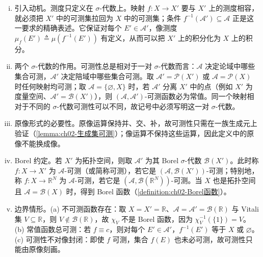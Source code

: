 \documentclass[../../main.tex]{subfiles}%
\begin{document}
\begin{remark}\label{remark:ch02-Borel可测}
\begin{enumerate}[(i)]
\item 引入动机。测度只定义在 $\sigma$-代数上。映射 $f:X\to X'$ 要与 $X'$ 上的测度相容，就必须把 $X'$ 中的可测集拉回为 $X$ 中的可测集；条件 $f^{-1}(\mathscr A')\subseteq\mathscr A$ 正是这一要求的精确表述。它保证对每个 $E'\in\mathscr A'$，像测度 $\mu_f(E')\triangleq\mu(f^{-1}(E'))$ 有定义，从而可以把 $X'$ 上的积分化为 $X$ 上的积分。
\item 两个 $\sigma$-代数的作用。可测性总是相对于一对 $\sigma$-代数而言：$\mathscr A$ 决定论域中哪些集合可测，$\mathscr A'$ 决定陪域中哪些集合可测。取 $\mathscr A'=\mathscr P(X')$ 或 $\mathscr A=\mathscr P(X)$ 时任何映射均可测；取 $\mathscr A=\{\varnothing,X\}$ 时，若 $\mathscr A'$ 分离 $X'$ 中的点（例如 $X'$ 为度量空间、$\mathscr A'=\mathscr B(X')$），则 $(\mathscr A,\mathscr A')$-可测函数必为常值。同一个映射相对于不同的 $\sigma$-代数可测性可以不同，故记号中必须写明这一对 $\sigma$-代数。
\item 原像形式的必要性。原像运算保持并、交、补，故可测性只需在一族生成元上验证（\cref{lemma:ch02-生成集可测}）；像运算不保持这些运算，因此定义中的原像不能换成像。
\item Borel 约定。若 $X'$ 为拓扑空间，则取 $\mathscr A'$ 为其 Borel $\sigma$-代数 $\mathscr B(X')$。此时称 $f:X\to X'$ 为 $\mathscr A$-可测（或简称可测），若它是 $(\mathscr A,\mathscr B(X'))$-可测；特别地，称 $f:X\to\mathbb{R}^N$ 为 $\mathscr A$-可测，若它是 $(\mathscr A,\mathscr B(\mathbb{R}^N))$-可测。当 $X$ 也是拓扑空间且 $\mathscr A=\mathscr B(X)$ 时，得到 Borel 函数（\cref{definition:ch02-Borel函数}）。
\item 边界情形。(a) 不可测函数存在：取 $X=X'=\mathbb{R}$、$\mathscr A=\mathscr A'=\mathscr B(\mathbb{R})$ 与 Vitali 集 $V\subseteq\mathbb{R}$，则 $V\notin\mathscr B(\mathbb{R})$，故 $\chi_V$ 不是 Borel 函数，因为 $\chi_V^{-1}(\{1\})=V$。(b) 常值函数总可测：若 $f\equiv c$，则对每个 $E'\in\mathscr A'$，$f^{-1}(E')$ 等于 $X$ 或 $\varnothing$。(c) 可测性不对像封闭：即使 $f$ 可测，集合 $f(E)$ 也未必可测，故可测性只能由原像刻画。
\end{enumerate}
\end{remark}
\end{document}
